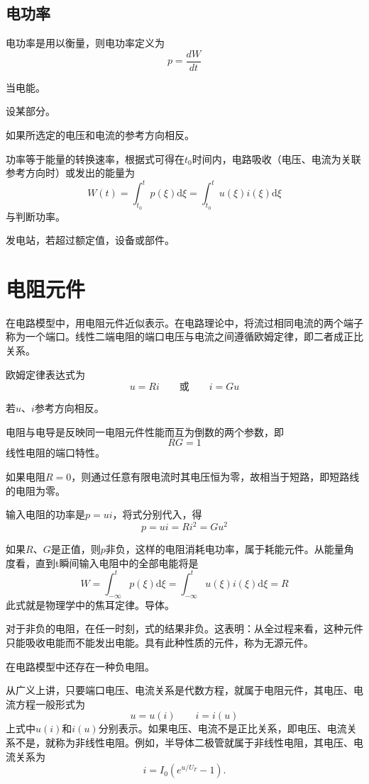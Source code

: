 \subsection{电功率}
电功率是用以衡量，则电功率定义为
\[
p=\frac{dW}{dt}
\]

当电能。

设某部分。

如果所选定的电压和电流的参考方向相反。

功率等于能量的转换速率，根据式可得在$t_0$时间内，电路吸收（电压、电流为关联参考方向时）或发出的能量为
\[
W(t)=\int_{t_0}^t p(\xi)\mathrm{d}\xi=\int_{t_0}^t u(\xi)i(\xi)\mathrm{d}\xi
\]
与判断功率。

发电站，若超过额定值，设备或部件。

\section{电阻元件}
在电路模型中，用电阻元件近似表示。在电路理论中，将流过相同电流的两个端子称为一个端口。线性二端电阻的端口电压与电流之间遵循欧姆定律，即二者成正比关系。

欧姆定律表达式为
\[
u=Ri \qquad \text{或} \qquad i=Gu
\]

若$u、i$参考方向相反。

电阻与电导是反映同一电阻元件性能而互为倒数的两个参数，即
\[
RG=1
\]
线性电阻的端口特性。

如果电阻$R=0$，则通过任意有限电流时其电压恒为零，故相当于短路，即短路线的电阻为零。

输入电阻的功率是$p=ui$，将式分别代入，得
\[
p=ui=Ri^2=Gu^2
\]

如果$R、G$是正值，则$p$非负，这样的电阻消耗电功率，属于耗能元件。从能量角度看，直到t瞬间输入电阻中的全部电能将是
\[
W=\int_{-\infty}^t p(\xi)\mathrm{d}\xi=\int_{-\infty}^t u(\xi)i(\xi)\mathrm{d}\xi=R
\]
此式就是物理学中的焦耳定律。导体。

对于非负的电阻，在任一时刻，式的结果非负。这表明：从全过程来看，这种元件只能吸收电能而不能发出电能。具有此种性质的元件，称为无源元件。

在电路模型中还存在一种负电阻。

从广义上讲，只要端口电压、电流关系是代数方程，就属于电阻元件，其电压、电流方程一般形式为
\[
u=u(i) \qquad i=i(u)
\]
上式中$u(i)$和$i(u)$分别表示。如果电压、电流不是正比关系，即电压、电流关系不是，就称为非线性电阻。例如，半导体二极管就属于非线性电阻，其电压、电流关系为
\[
i=I_0\left(e^{u/U_T}-1\right).
\]

